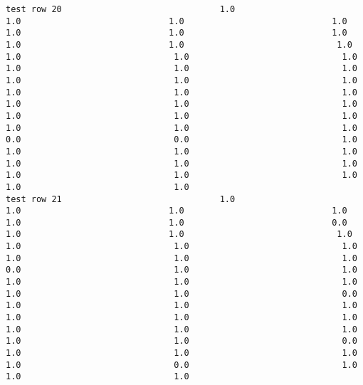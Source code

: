 \documentclass[11pt]{article}
\begin{document}
\begin{verbatim}
test row 20                               1.0                             1.0                             1.0                             1.0                             1.0                             1.0                             1.0                             1.0                             1.0                              1.0                              1.0                              1.0                              1.0                              1.0                              1.0                              1.0                              1.0                              1.0                              1.0                              1.0                              1.0                              1.0                              1.0                              1.0                              1.0                              1.0                              1.0                              1.0                              1.0                              1.0                              1.0                              0.0                              0.0                              1.0                              1.0                              1.0                              1.0                              1.0                              1.0                              1.0                              1.0                              1.0                              1.0                              1.0                              1.0
test row 21                               1.0                             1.0                             1.0                             1.0                             1.0                             1.0                             0.0                             1.0                             1.0                              1.0                              1.0                              1.0                              1.0                              1.0                              1.0                              1.0                              0.0                              1.0                              1.0                              1.0                              1.0                              1.0                              1.0                              1.0                              0.0                              1.0                              1.0                              1.0                              1.0                              1.0                              1.0                              1.0                              1.0                              1.0                              1.0                              1.0                              0.0                              1.0                              1.0                              1.0                              1.0                              0.0                              1.0                              1.0                              1.0

\end{verbatim}
\end{document}
